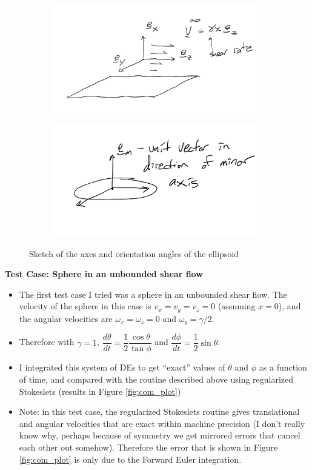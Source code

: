 \documentclass{article}
\begin{document}
\begin{figure}
  \centering
  \begin{subfigure}{0.59\textwidth}
    \includegraphics[width=\textwidth]{axes}
  \end{subfigure}
  \hfill
  \begin{subfigure}{0.49\textwidth}
    \includegraphics[width=\textwidth]{reference}
  \end{subfigure}
  \caption{Sketch of the axes and orientation angles of the ellipsoid}
  \label{fig:sketches}
\end{figure}

\textbf{Test Case: Sphere in an unbounded shear flow}
\begin{itemize}
\item The first test case I tried was a sphere in an unbounded shear
  flow. The velocity of the sphere in this case is $v_x = v_y = v_z =
  0$ (assuming $x = 0$), and the angular velocities are $\omega_x =
  \omega_z = 0$ and $\omega_y = \gamma/2$.
\item Therefore with $\gamma = 1$, $\dfrac{d\theta}{dt} = \dfrac{1}{2}
  \dfrac{\cos\theta}{\tan\phi}$ and $\dfrac{d\phi}{dt} = \dfrac{1}{2}
  \sin\theta$.
\item I integrated this system of DEs to get ``exact'' values of
  $\theta$ and $\phi$ as a function of time, and compared with the
  routine described above using regularized Stokeslets (results in
  Figure \ref{fig:com_plot})
\item Note: in this test case, the regularized Stokeslets routine
  gives translational and angular velocities that are exact within
  machine precision (I don't really know why, perhaps because of
  symmetry we get mirrored errors that cancel each other out
  somehow). Therefore the error that is shown in Figure
  \ref{fig:com_plot} is only due to the Forward Euler integration.
\end{itemize}
\end{document}
